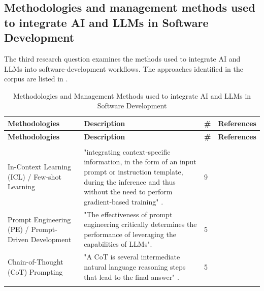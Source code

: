 \subsection{Methodologies and management methods used to integrate AI and LLMs in Software Development}

The third research question examines the methods used to integrate \ac{AI} and \acp{LLM} into software-development workflows. The approaches identified in the corpus are listed in .

{\footnotesize
\begin{longtable}{>{\raggedright\arraybackslash} p{3cm} p{9.3cm} p{0.2cm} >{\raggedright\arraybackslash}p{1.8cm}}
\caption[Methodologies and management methods for integrating AI and LLMs]{Methodologies and Management Methods used to integrate AI and LLMs in Software Development}
\label{tab:methodologies} \\

\toprule
\textbf{Methodologies} & \textbf{Description} & \textbf{\#} & \textbf{References}\\
\midrule
\endfirsthead

\toprule
\textbf{Methodologies} & \textbf{Description} & \textbf{\#} & \textbf{References}\\
\midrule
\endhead

\midrule
\multicolumn{4}{r}{\textit{Continued on next page}}\\
\bottomrule
\endfoot

\bottomrule
\endlastfoot

In-Context Learning (ICL) / Few-shot Learning & "integrating context-specific information, in the form of an input prompt or instruction template, during the inference and thus without the need to perform gradient-based training" \cite{Weyssow:2025ep}. & 9 & \cite{Weyssow:2025ep, Terragni:2025fa, Chen:2025es, Ramos:2025aa, Durrani:2024ad, Gao:2025cc, Hemmat:2025rd, Qiu:2025ft, Jabrw:2025ss} \\ \addlinespace

Prompt Engineering (PE) / Prompt-Driven Development & "The effectiveness of prompt engineering critically determines the performance of leveraging the capabilities of LLMs". \cite{Jabrw:2025ss} & 5 &  \cite{Jabrw:2025ss, Pendyala:2025pi, Qiu:2025ft, Ahmed:2025ai, Chen:2025es} \\ \addlinespace

Chain-of-Thought (CoT) Prompting & "A CoT is several intermediate natural language reasoning steps that lead to the final answer" \cite{Li:2025sc}. & 5 & \cite{Li:2025sc, Jabrw:2025ss, Chen:2025es, Ahmed:2025ai, Gao:2025cc} \\ \addlinespace


\end{longtable}}

